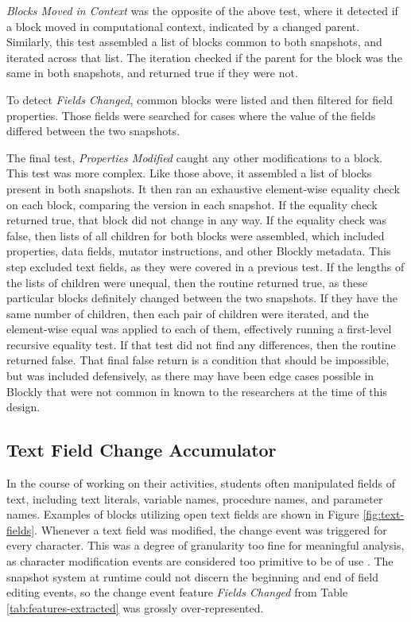 \emph{Blocks Moved in Context} was the opposite of the above test, where it detected if a block moved in computational context, indicated by a changed parent. Similarly, this test assembled a list of blocks common to both snapshots, and iterated across that list. The iteration checked if the parent for the block was the same in both snapshots, and returned true if they were not. 

To detect \emph{Fields Changed}, common blocks were listed and then filtered for field properties. Those fields were searched for cases where the value of the fields differed between the two snapshots.

The final test, \emph{Properties Modified} caught any other modifications to a block. This test was more complex. Like those above, it assembled a list of blocks present in both snapshots. It then ran an exhaustive element-wise equality check on each block, comparing the version in each snapshot. If the equality check returned true, that block did not change in any way. If the equality check was false, then lists of all children for both blocks were assembled, which included properties, data fields, mutator instructions, and other Blockly metadata. This step excluded text fields, as they were covered in a previous test. If the lengths of the lists of children were unequal, then the routine returned true, as these particular blocks definitely changed between the two snapshots. If they have the same number of children, then each pair of children were iterated, and the element-wise equal was applied to each of them, effectively running a first-level recursive equality test. If that test did not find any differences, then the routine returned false. That final false return is a condition that should be impossible, but was included defensively, as there may have been edge cases possible in Blockly that were not common in known to the researchers at the time of this design.


\subsection{Text Field Change Accumulator}
\label{sec:text-acc}
In the course of working on their activities, students often manipulated fields of text, including text literals, variable names, procedure names, and parameter names. Examples of blocks utilizing open text fields are shown in Figure \ref{fig:text-fields}. Whenever a text field was modified, the change event was triggered for every character. This was a degree of granularity too fine for meaningful analysis, as character modification events are considered too primitive to be of use \citep{omori2008change}. The snapshot system at runtime could not discern the beginning and end of field editing events, so the change event feature \emph{Fields Changed} from Table \ref{tab:features-extracted} was grossly over-represented. 

